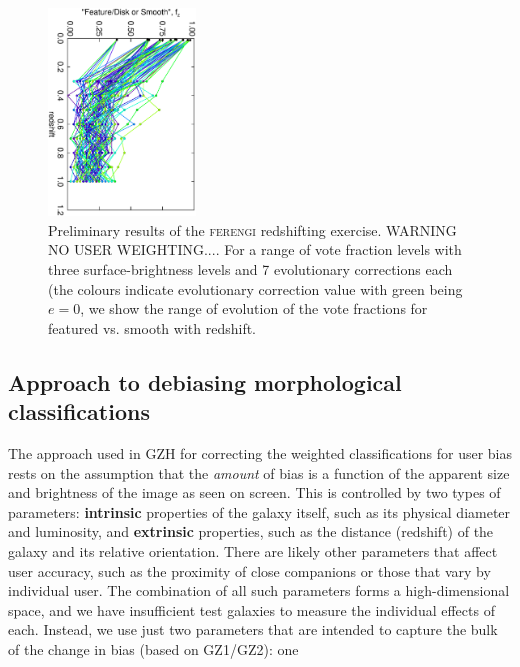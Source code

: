 \documentclass[usenatbib]{mn2e}
\newcommand{\ferengi}{\textsc{ferengi}}
\begin{document}
\begin{figure}
\begin{center}

\includegraphics[width=0.35\textwidth,angle=90]{somewhat_fake_results.ps}

\caption{Preliminary results of the \ferengi{} redshifting exercise. WARNING NO USER WEIGHTING.... For a range of vote fraction levels with three surface-brightness levels and 7 evolutionary corrections each (the colours indicate evolutionary correction value with green being $e=0$, we show the range of evolution of the vote fractions for featured vs. smooth with redshift.}

\label{fig:ferengi_results_fake}

\end{center}
\end{figure}

\subsection{Approach to debiasing morphological classifications}

The approach used in GZH for correcting the weighted classifications for user bias rests on the assumption that the \emph{amount} of bias is a function of the apparent size and brightness of the image as seen on screen. This is controlled by two types of parameters: \textbf{intrinsic} properties of the galaxy itself, such as its physical diameter and luminosity, and \textbf{extrinsic} properties, such as the distance (redshift) of the galaxy and its relative orientation. There are likely other parameters that affect user accuracy, such as the proximity of close companions \citep[``distraction bias''; see][]{joh15} or those that vary by individual user. The combination of all such parameters forms a high-dimensional space, and we have insufficient test galaxies to measure the individual effects of each. Instead, we use just two parameters that are intended to capture the bulk of the change in bias (based on GZ1/GZ2): one 
\end{document}

